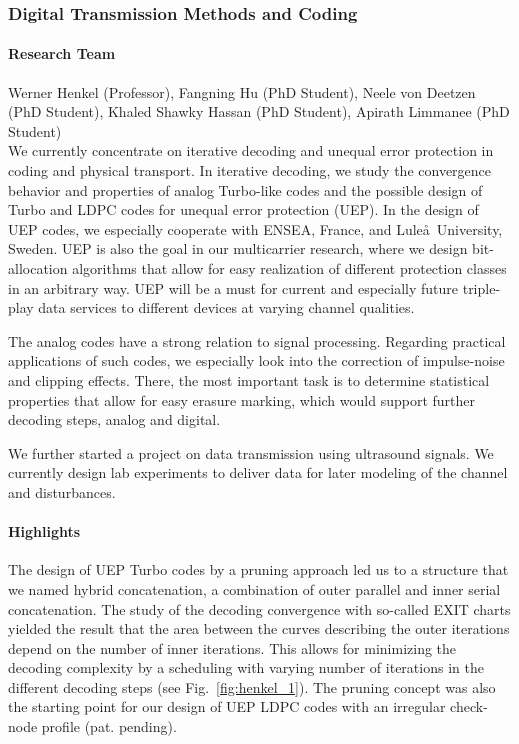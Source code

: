 \subsubsection{Digital Transmission Methods and Coding}
\label{ict:cns:henkel} 

\paragraph{Research Team}
Werner Henkel (Professor), Fangning Hu (PhD Student), Neele von Deetzen (PhD
Student), Khaled Shawky Hassan (PhD Student), Apirath Limmanee (PhD Student)\\

We currently concentrate on iterative decoding and unequal error protection in
coding and physical transport. In iterative decoding, we study the convergence
behavior and properties of analog Turbo-like codes and the possible design of
Turbo and LDPC codes for unequal error protection (UEP). In the design of UEP
codes, we especially cooperate with ENSEA, France, and Lule\aa\ University,
Sweden. UEP is also the goal in our multicarrier research, where we design
bit-allocation algorithms that allow for easy realization of different
protection classes in an arbitrary way. UEP will be a must for current and
especially future triple-play data services to different devices at varying
channel qualities.

The analog codes have a strong relation to signal processing. Regarding
practical applications of such codes, we especially look into the correction
of impulse-noise and clipping effects. There, the most important task is to
determine statistical properties that allow for easy erasure marking, which
would support further decoding steps, analog and digital.

We further started a project on data transmission using ultrasound signals. We
currently design lab experiments to deliver data for later modeling of the
channel and disturbances.


\paragraph{Highlights}

The design of UEP Turbo codes by a pruning approach led us to a structure that
we named hybrid concatenation, a combination of outer parallel and inner
serial concatenation. The study of the decoding convergence with so-called EXIT
charts yielded the result that the area between the curves describing the
outer iterations depend on the number of inner iterations. This allows for
minimizing the decoding complexity by a scheduling with varying number of
iterations in the different decoding steps (see Fig.~\ref{fig:henkel_1}). The
pruning concept was also the starting point for our design of UEP LDPC codes
with an irregular check-node profile (pat. pending).

